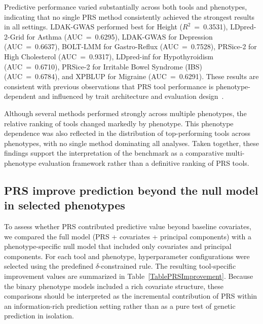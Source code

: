\documentclass[pdflatex,sn-basic]{sn-jnl}
\begin{document}
Predictive performance varied substantially across both tools and phenotypes, indicating that no single PRS method consistently achieved the strongest results in all settings. LDAK-GWAS performed best for Height ($R^2$~=~0.3531), LDpred-2-Grid for Asthma (AUC~=~0.6295), LDAK-GWAS for Depression (AUC~=~0.6637), BOLT-LMM for Gastro-Reflux (AUC~=~0.7528), PRSice-2 for High Cholesterol (AUC~=~0.9317), LDpred-inf for Hypothyroidism (AUC~=~0.6710), PRSice-2 for Irritable Bowel Syndrome (IBS) (AUC~=~0.6784), and XPBLUP for Migraine (AUC~=~0.6291). These results are consistent with previous observations that PRS tool performance is phenotype-dependent and influenced by trait architecture and evaluation design~\cite{Ma2021}.

Although several methods performed strongly across multiple phenotypes, the relative ranking of tools changed markedly by phenotype. This phenotype dependence was also reflected in the distribution of top-performing tools across phenotypes, with no single method dominating all analyses. Taken together, these findings support the interpretation of the benchmark as a comparative multi-phenotype evaluation framework rather than a definitive ranking of PRS tools.  



 

\subsection*{PRS improve prediction beyond the null model in selected phenotypes}

To assess whether PRS contributed predictive value beyond baseline covariates, we compared the full model (PRS + covariates + principal components) with a phenotype-specific null model that included only covariates and principal components. For each tool and phenotype, hyperparameter configurations were selected using the predefined $\delta$-constrained rule. The resulting tool-specific improvement values are summarized in Table~\ref{TablePRSImprovement}. Because the binary phenotype models included a rich covariate structure, these comparisons should be interpreted as the incremental contribution of PRS within an information-rich prediction setting rather than as a pure test of genetic prediction in isolation.
\end{document}
